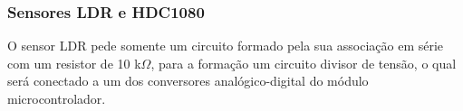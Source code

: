 




\subsubsection{Sensores LDR e HDC1080}

O sensor LDR pede somente um circuito formado pela sua associação em série com um resistor de 10 k$\Omega$, para a formação um circuito divisor de tensão, o qual será conectado a um dos conversores analógico-digital do módulo microcontrolador.


